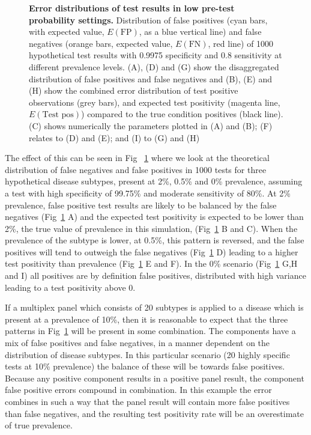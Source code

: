 \documentclass[10pt,letterpaper]{article}
\begin{document}
\begin{figure}[hb!]
\caption{{\bf Error distributions of test results in low pre-test probability settings.}
 Distribution of false positives (cyan bars, with expected value, \(E(\textrm{FP})\), as a blue vertical line) and false negatives (orange bars, expected value, \(E(\textrm{FN})\), red line) of 1000 hypothetical test results with 0.9975 specificity and 0.8 sensitivity at different prevalence levels. (A), (D) and (G) show the disaggregated distribution of false positives and false negatives and (B), (E) and (H) show the combined error distribution of test positive observations (grey bars), and expected test positivity (magenta line, \(E(\textrm{Test pos})\)) compared to the true condition positives (black line). (C) shows numerically the parameters plotted in (A) and (B); (F) relates to (D) and (E); and (I) to (G) and (H)}
\label{fig2}
\end{figure}

The effect of this can be seen in Fig ~\ref{fig2} where we look at the theoretical distribution of false negatives and false positives in 1000 tests for three hypothetical disease subtypes, present at 2\%, 0.5\% and 0\% prevalence, assuming a test with high specificity of 99.75\% and moderate sensitivity of 80\%. At 2\% prevalence, false positive test results are likely to be balanced by the false negatives (Fig~\ref{fig2} A) and the expected test positivity is expected to be lower than 2\%, the true value of prevalence in this simulation, (Fig~\ref{fig2} B and C). When the prevalence of the subtype is lower, at 0.5\%, this pattern is reversed, and the false positives will tend to outweigh the false negatives (Fig~\ref{fig2} D) leading to a higher test positivity than prevalence (Fig~\ref{fig2} E and F). In the 0\% scenario (Fig~\ref{fig2} G,H and I) all positives are by definition false positives,  distributed with high variance leading to a test positivity above 0.

If a multiplex panel which consists of 20 subtypes is applied to a disease which is present at a prevalence of 10\%, then it is reasonable to expect that the three patterns in Fig~\ref{fig2} will be present in some combination. The components have a mix of false positives and false negatives, in a manner dependent on the distribution of disease subtypes. In this particular scenario (20 highly specific tests at 10\% prevalence) the balance of these will be towards false positives. Because any positive component results in a positive panel result, the component false positive errors compound in combination. In this example the error combines in such a way that the panel result will contain more false positives than false negatives, and the resulting test positivity rate will be an overestimate of true prevalence.
\end{document}
